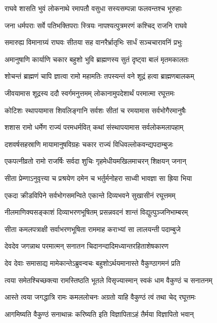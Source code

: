 \twolineshloka
{राघवे शासति भुवं लोकनाथे रमापतौ}
{वसुधा सस्यसम्पन्ना फलवन्तश्च भूरुहाः} %

\twolineshloka
{जना धर्मपराः सर्वे पतिभक्तिपराः स्त्रियः}
{नापश्यत्पुत्रमरणं कश्चिद् राजनि राघवे} %

\twolineshloka
{समारुह्य विमानाग्र्यं राघवः सीतया सह}
{वानरैर्भ्रातृभिः सार्धं सञ्चचारावनिं प्रभुः} %

\twolineshloka
{अमानुषाणि कार्याणि चकार बहुशो भुवि}
{ब्राह्मणस्य सुतं दृष्ट्वा बालं मृतमकालतः} %

\twolineshloka
{शोचन्तं ब्राह्मणं चापि ज्ञात्वा रामो महामतिः}
{तपस्यन्तं वने शूद्रं हत्वा ब्राह्मणबालकम्} %

\twolineshloka
{जीवयामास शूद्रस्य ददौ स्वर्गमनुत्तमम्}
{लोकानामुपदेशार्थं परमात्मा रघूत्तमः} %

\twolineshloka
{कोटिशः स्थापयामास शिवलिङ्गानि सर्वशः}
{सीतां च रमयामास सर्वभोगैरमानुषैः} %

\twolineshloka
{शशास रामो धर्मेण राज्यं परमधर्मवित्}
{कथां संस्थापयामास सर्वलोकमलापहाम्} %

\twolineshloka
{दशवर्षसहस्राणि मायामानुषविग्रहः}
{चकार राज्यं विधिवल्लोकवन्द्यपदाम्बुजः} %

\twolineshloka
{एकपत्नीव्रतो रामो राजर्षिः सर्वदा शुचिः}
{गृहमेधीयमखिलमाचरन् शिक्षयन् जनान्} %

\twolineshloka
{सीता प्रेम्णाऽनुवृत्त्या च प्रश्रयेण दमेन च}
{भर्तुर्मनोहरा साध्वी भावज्ञा सा ह्रिया भिया} %

\twolineshloka
{एकदा क्रीडविपिने सर्वभोगसमन्विते}
{एकान्ते दिव्यभवने सुखासीनं रघूत्तमम्} %

\twolineshloka
{नीलमाणिक्यसङ्काशं दिव्याभरणभूषितम्}
{प्रसन्नवदनं शान्तं विद्युत्पुञ्जनिभाम्बरम्} %

\twolineshloka
{सीता कमलपत्राक्षी सर्वाभरणभूषिता}
{राममाह कराभ्यां सा लालयन्ती पदाम्बुजे} %

\twolineshloka
{देवदेव जगन्नाथ परमात्मन् सनातन}
{चिदानन्दादिमध्यान्तरहिताशेषकारण} %

\twolineshloka
{देव देवाः समासाद्य मामेकान्तेऽब्रुवन्वचः}
{बहुशोऽर्थयमानास्ते वैकुण्ठागमनं प्रति} %

\twolineshloka
{त्वया समेतश्चिच्छक्त्या रामस्तिष्ठति भूतले}
{विसृज्यास्मान् स्वकं धाम वैकुण्ठं च सनातनम्} %

\twolineshloka
{आस्ते त्वया जगद्धात्रि रामः कमललोचनः}
{अग्रतो याहि वैकुण्ठं त्वं तथा चेद् रघूत्तमः} %

\twolineshloka
{आगमिष्यति वैकुण्ठं सनाथान्नः करिष्यति}
{इति विज्ञापिताऽहं तैर्मया विज्ञापितो भवान्} %

